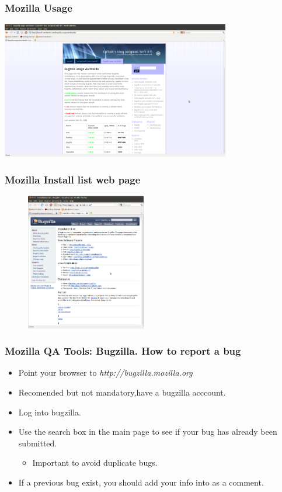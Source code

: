 \documentclass{beamer}
\begin{document}
\begin{frame}
\frametitle{Mozilla Usage}
\begin{center}
 \includegraphics[height=6cm]{figs/Bugzilla_usage_worldwide.png}
\begin{figure}
\end{figure}
\end{center}
\end{frame}


\begin{frame}
\frametitle{Mozilla Install list web page}
\begin{center}
\begin{figure}
 \includegraphics[height=6cm]{figs/Bugzilla_Install_List.png}
\end{figure}
\end{center}
\end{frame}


\begin{frame}
 \frametitle{Mozilla QA Tools: Bugzilla. How to report a bug}
 \begin{itemize}
    \item Point your browser to \textit{http://bugzilla.mozilla.org}
    \item Recomended but not mandatory,have a bugzilla acccount.
    \item Log into bugzilla.
    \item Use the search box in the main page to see if your bug has already been submitted.
    \begin{itemize}
       \item Important to avoid duplicate bugs.
    \end{itemize}
    \item If a previous bug exist, you should add your info into as a comment.
 \end{itemize}
\end{frame}
\end{document}
